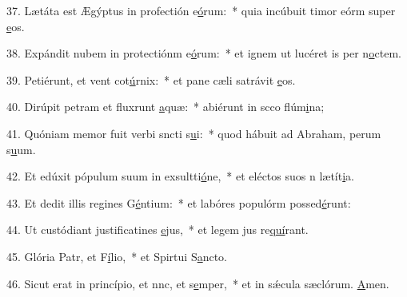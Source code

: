 37. Lætáta est Ægýptus in profectión e\uline{ó}rum:~* quia incúbuit timor eórm super \uline{e}os.\par 
38. Expándit nubem in protectiónm e\uline{ó}rum:~* et ignem ut lucéret is per n\uline{o}ctem.\par 
39. Petiérunt, et vent cot\uline{ú}rnix:~* et pane cæli satrávit \uline{e}os.\par 
40. Dirúpit petram et fluxrunt \uline{a}quæ:~* abiérunt in scco flúm\uline{i}na;\par 
41. Quóniam memor fuit verbi sncti s\uline{u}i:~* quod hábuit ad Abraham, perum s\uline{u}um.\par 
42. Et edúxit pópulum suum in exsultti\uline{ó}ne,~* et eléctos suos n lætít\uline{i}a.\par 
43. Et dedit illis regines G\uline{é}ntium:~* et labóres populórm possed\uline{é}runt:\par 
44. Ut custódiant justificatines \uline{e}jus,~* et legem jus re\uline{quí}rant.\par 
45. Glória Patr, et F\uline{í}lio,~* et Spirtui S\uline{a}ncto.\par 
46. Sicut erat in princípio, et nnc, et s\uline{e}mper,~* et in sǽcula sæclórum. \uline{A}men.\par 

